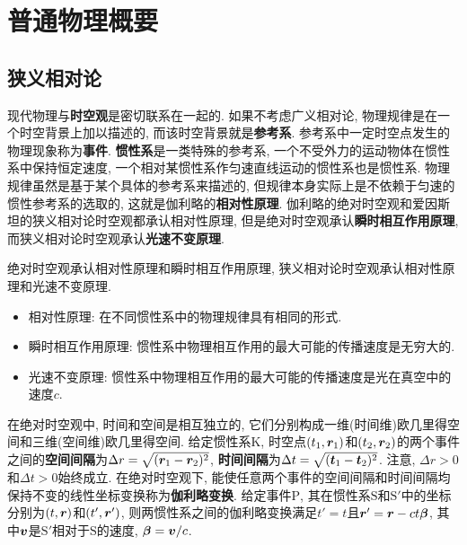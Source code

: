 \chapter[普通物理概要]{普通物理概要}
\section[狭义相对论]{狭义相对论}\label{狭义相对论}
现代物理与\textbf{时空观}是密切联系在一起的. 如果不考虑广义相对论, 物理规律是在一个时空背景上加以描述的, 而该时空背景就是\textbf{参考系}. 参考系中一定时空点发生的物理现象称为\textbf{事件}. \textbf{惯性系}是一类特殊的参考系, 一个不受外力的运动物体在惯性系中保持恒定速度, 一个相对某惯性系作匀速直线运动的惯性系也是惯性系. 物理规律虽然是基于某个具体的参考系来描述的, 但规律本身实际上是不依赖于匀速的惯性参考系的选取的, 这就是伽利略的\textbf{相对性原理}. 伽利略的绝对时空观和爱因斯坦的狭义相对论时空观都承认相对性原理, 但是绝对时空观承认\textbf{瞬时相互作用原理}, 而狭义相对论时空观承认\textbf{光速不变原理}.
\begin{postulate}[时空观的基本假设]\label{pos:时空观的基本假设}
    绝对时空观承认相对性原理和瞬时相互作用原理, 狭义相对论时空观承认相对性原理和光速不变原理.
    \begin{itemize}
        \item 相对性原理: 在不同惯性系中的物理规律具有相同的形式.
        \item 瞬时相互作用原理: 惯性系中物理相互作用的最大可能的传播速度是无穷大的.
        \item 光速不变原理: 惯性系中物理相互作用的最大可能的传播速度是光在真空中的速度$ c $.
    \end{itemize}
\end{postulate}
在绝对时空观中, 时间和空间是相互独立的, 它们分别构成一维(时间维)欧几里得空间和三维(空间维)欧几里得空间. 给定惯性系$ \mathrm{K} $, 时空点$ (t_1,\vb*{r}_1) $和$ (t_2,\vb*{r}_2) $的两个事件之间的\textbf{空间间隔}为$ \Delta r = \sqrt{(\vb*{r}_1-\vb*{r}_2)^2} $, \textbf{时间间隔}为$ \Delta t = \sqrt{(\vb*{t}_1-\vb*{t}_2)^2} $. 注意, $ \Delta r > 0 $和$ \Delta t > 0 $始终成立. 在绝对时空观下, 能使任意两个事件的空间间隔和时间间隔均保持不变的线性坐标变换称为\textbf{伽利略变换}. 给定事件$ \mathrm{P} $, 其在惯性系$ \mathrm{S} $和$ \mathrm{S}' $中的坐标分别为$ (t,\vb*{r}) $和$ (t',\vb*{r}') $, 则两惯性系之间的伽利略变换满足$ t'=t $且$ \vb*{r}'=\vb*{r}-ct\vb*{\beta} $, 其中$ \vb*{v} $是$ \mathrm{S}' $相对于$ \mathrm{S} $的速度, $ \vb*{\beta}=\vb*{v}/c $.


